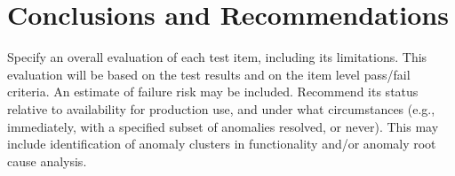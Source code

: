 \section{Conclusions and Recommendations}
\label{sec:conclusions}
Specify an overall evaluation of each test item, including its limitations. This evaluation will be based
on the test results and on the item level pass/fail criteria. An estimate of failure risk may be included.
Recommend its status relative to availability for production use, and under what circumstances (e.g.,
immediately, with a specified subset of anomalies resolved, or never). This may include identification
of anomaly clusters in functionality and/or anomaly root cause analysis.
